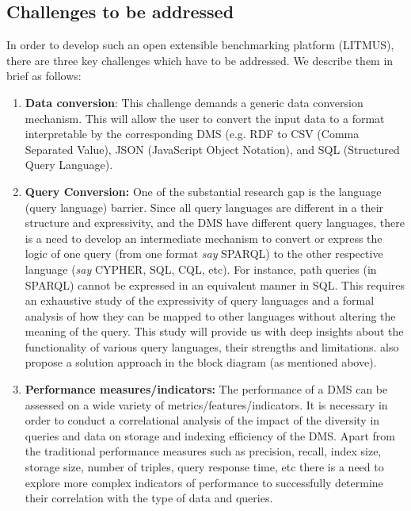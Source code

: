 \documentclass{llncs}
\begin{document}
    \subsection{Challenges to be addressed}
    In order to develop such an open extensible benchmarking platform (LITMUS), there are three key challenges which have to be addressed. We describe them in brief as follows:
        \begin{enumerate}
            \item             
            \textbf{ Data conversion}: This challenge demands a generic data conversion mechanism. This will allow the user to convert the input data to a format interpretable by the corresponding DMS (e.g. RDF to CSV (Comma Separated Value), JSON (JavaScript Object Notation),  and SQL (Structured Query Language).
            \item {} \textbf{Query Conversion:} 
            One of the substantial research gap is the language (query language) barrier. Since all query languages are different in a their structure and expressivity, and the DMS have different query languages, there is a need to develop an intermediate mechanism to convert or express the logic of one query (from one format \textit{say} SPARQL) to the other respective language (\textit{say} CYPHER, SQL, CQL, etc). For instance, path queries (in SPARQL) cannot be expressed in an equivalent manner in SQL. This requires an exhaustive study of the expressivity of query languages and a formal analysis of how they can be mapped to other languages without altering the meaning of the query. This study will provide us with deep insights about the functionality of various query languages, their strengths and limitations.
            also propose a solution approach in the block diagram (as mentioned above).
            \item {} \textbf{Performance measures/indicators:} 
            The performance of a DMS can be assessed on a wide variety of metrics/features/indicators. It is necessary in order to conduct a correlational analysis of the impact of the diversity in queries and data on storage and indexing efficiency of the DMS. Apart from the traditional performance measures such as precision, recall, index size, storage size, number of triples, query response time, etc there is a need to explore more complex indicators of performance to successfully determine their correlation with the type of data and queries.
        \end{enumerate}
\end{document}
